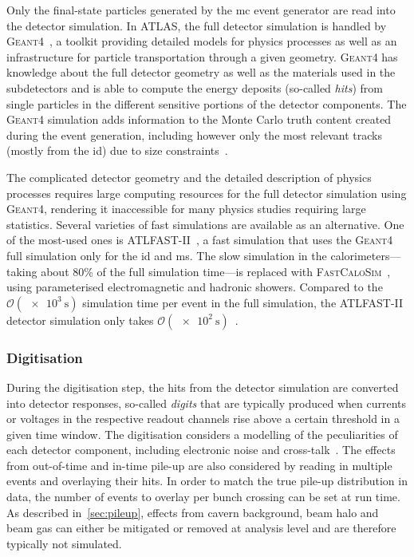 Only the final-state particles generated by the \gls{mc} event generator are read into the detector simulation. In ATLAS, the full detector simulation is handled by \textsc{Geant4}~\cite{geant:2002hh}, a toolkit providing detailed models for physics processes as well as an infrastructure for particle transportation through a given geometry. \textsc{Geant4} has knowledge about the full detector geometry as well as the materials used in the subdetectors and is able to compute the energy deposits (so-called \textit{hits}) from single particles in the different sensitive portions of the detector components. The \textsc{Geant4} simulation adds information to the Monte Carlo truth content created during the event generation, including however only the most relevant tracks (mostly from the \gls{id}) due to size constraints~\cite{Aad:2010ah}.

The complicated detector geometry and the detailed description of physics processes requires large computing resources for the full detector simulation using \textsc{Geant4}, rendering it inaccessible for many physics studies requiring large statistics. Several varieties of fast simulations are available as an alternative. One of the most-used ones is \textsc{ATLFAST-II}~\cite{Aad:2010ah}, a fast simulation that uses the \textsc{Geant4} full simulation only for the \gls{id} and \gls{ms}. The slow simulation in the calorimeters---taking about 80\% of the full simulation time---is replaced with \textsc{FastCaloSim}~\cite{ATL-SOFT-PUB-2018-002}, using parameterised electromagnetic and hadronic showers. Compared to the $\mathcal{O}(\SI{e3}{\second})$ simulation time per event in the full simulation, the \textsc{ATLFAST-II} detector simulation only takes $\mathcal{O}(\SI{e2}{\second})$~\cite{Aad:2010ah}. 

\subsubsection{Digitisation}

During the digitisation step, the hits from the detector simulation are converted into detector responses, so-called \textit{digits} that are typically produced when currents or voltages in the respective readout channels rise above a certain threshold in a given time window. The digitisation considers a modelling of the peculiarities of each detector component, including electronic noise and cross-talk~\cite{Aad:2010ah}. The effects from out-of-time and in-time pile-up are also considered by reading in multiple events and overlaying their hits. In order to match the true pile-up distribution in data, the number of events to overlay per bunch crossing can be set at run time. As described in~\cref{sec:pileup}, effects from cavern background, beam halo and beam gas can either be mitigated or removed at analysis level and are therefore typically not simulated. 

